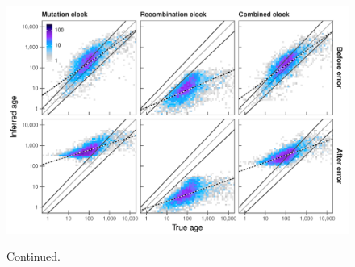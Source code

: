 

\begin{figure}[tb]
\ContinuedFloat
{\small{}} \\
\includegraphics[width=\textwidth]{./img/ch5/generror_scat_hmm}
\caption[]{Continued.}
\label{fig:generror_scat_hmm}
\end{figure}
